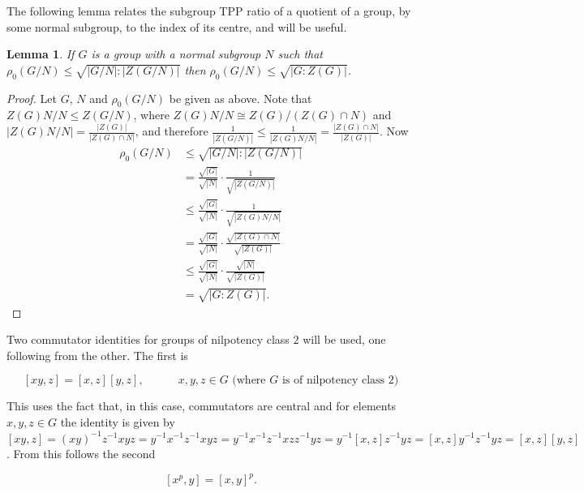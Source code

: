 \documentclass{amsart}
\theoremstyle{observation}
\newtheorem{lemma}[theorem]{Lemma}
\theoremstyle{definition}
\theoremstyle{remark}
\numberwithin{equation}{section}
\begin{document}
The following lemma relates the subgroup TPP ratio of a quotient of a group, by some normal subgroup, to the index of its centre, and will be useful.

\begin{lemma}\label{LemQuoNilpClassTwo} If $G$ is a group with a normal subgroup $N$ such that $\rho_0(G/N) \leq \sqrt{|G/N|:|Z(G/N)|}$ then $\rho_0(G/N) \leq \sqrt{|G:Z(G)|}$.
\end{lemma}
\begin{proof} Let $G$, $N$ and $\rho_0(G/N)$ be given as above. Note that $Z(G)N/N \leq Z(G/N)$, where $Z(G)N/N \cong Z(G)/(Z(G) \cap N)$ and $|Z(G)N/N| = \frac{|Z(G)|}{|Z(G) \cap N|}$, and therefore $\frac{1}{|Z(G/N)|} \leq \frac{1}{|Z(G)N/N|} = \frac{|Z(G) \cap N|}{|Z(G)|}$. Now
\begin{align*}\rho_0(G/N) &\leq \sqrt{|G/N|:|Z(G/N)|} \\
                          &= \frac{\sqrt{|G|}}{\sqrt{|N|}}\cdot\frac{1}{\sqrt{|Z(G/N)|}} \\
                          &\leq \frac{\sqrt{|G|}}{\sqrt{|N|}}\cdot\frac{1}{\sqrt{|Z(G)N/N|}} \\
                          &= \frac{\sqrt{|G|}}{\sqrt{|N|}}\cdot\frac{\sqrt{|Z(G) \cap N|}}{\sqrt{|Z(G)|}} \\
                          &\leq \frac{\sqrt{|G|}}{\sqrt{|N|}}\cdot\frac{\sqrt{|N|}}{\sqrt{|Z(G)|}} \\
                          &= \sqrt{|G:Z(G)|}.
\end{align*}
\end{proof}

Two commutator identities for groups of nilpotency class $2$ will be used, one following from the other. The first is

\begin{equation}\label{EqCommId} [xy, z] = [x, z][y, z], \hspace{3em}x, y, z \in G \text{ (where $G$ is of nilpotency class $2$)}
\end{equation}

This uses the fact that, in this case, commutators are central and for elements $x, y, z \in G$ the identity is given by $[xy, z] = (xy)^{-1}z^{-1}xyz = y^{-1}x^{-1}z^{-1}xyz = y^{-1}x^{-1}z^{-1}xzz^{-1}yz = y^{-1}[x, z]z^{-1}yz = [x, z]y^{-1}z^{-1}yz = [x, z][y, z]$. From this follows the second

\begin{equation}\label{EqCommId2} [x^p, y] = [x, y]^p.
\end{equation}
\end{document}
